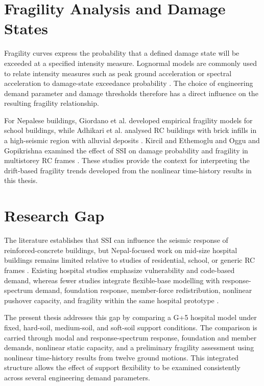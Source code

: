 \section{Fragility Analysis and Damage States}
Fragility curves express the probability that a defined damage state will be exceeded at a specified intensity measure. Lognormal models are commonly used to relate intensity measures such as peak ground acceleration or spectral acceleration to damage-state exceedance probability \cite{giordano2021,adhikari2022}. The choice of engineering demand parameter and damage thresholds therefore has a direct influence on the resulting fragility relationship.

For Nepalese buildings, Giordano et al. developed empirical fragility models for school buildings, while Adhikari et al. analysed RC buildings with brick infills in a high-seismic region with alluvial deposits \cite{giordano2021,adhikari2022}. Kircil and Ethemoglu and Oggu and Gopikrishna examined the effect of SSI on damage probability and fragility in multistorey RC frames \cite{kircil2025,oggu2025}. These studies provide the context for interpreting the drift-based fragility trends developed from the nonlinear time-history results in this thesis.

\section{Research Gap}
The literature establishes that SSI can influence the seismic response of reinforced-concrete buildings, but Nepal-focused work on mid-size hospital buildings remains limited relative to studies of residential, school, or generic RC frames \cite{adhikari2022,paudel2024seismic,giordano2021,yadav2023}. Existing hospital studies emphasize vulnerability and code-based demand, whereas fewer studies integrate flexible-base modelling with response-spectrum demand, foundation response, member-force redistribution, nonlinear pushover capacity, and fragility within the same hospital prototype \cite{guragain2004,subedi2022}.

The present thesis addresses this gap by comparing a G+5 hospital model under fixed, hard-soil, medium-soil, and soft-soil support conditions. The comparison is carried through modal and response-spectrum response, foundation and member demands, nonlinear static capacity, and a preliminary fragility assessment using nonlinear time-history results from twelve ground motions. This integrated structure allows the effect of support flexibility to be examined consistently across several engineering demand parameters.

